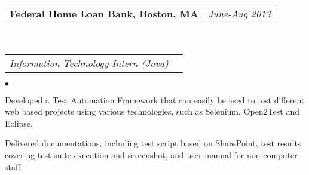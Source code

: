 \documentclass[11pt]{article}
\makeatletter
\newenvironment{achievements}{\begin{list}{$\bullet$}{\topsep 0pt \itemsep -2pt}}{\vspace*{4pt}\end{list}}
\newcommand{\headerrow}[2]
{\begin{tabular*}{\linewidth}{l@{\extracolsep{\fill}}r}
	\hspace*{-15pt}#1 & #2 \\
\end{tabular*}}
\newcommand{\headerrowww}[1]
{\begin{tabular*}{\linewidth}{l@{\extracolsep{\fill}}r}
	#1 &\\
\end{tabular*}}
\newcommand{\CPP}
 {C\nolinebreak[4]\hspace{-.05em}\raisebox{.22ex}{\footnotesize\bf ++}}
\makeatother
\begin{document}
\headerrow
{\textbf{Federal Home Loan Bank, Boston, MA}}
{\emph{June-Aug 2013}}
\\
\headerrowww
{\emph{Information Technology Intern (Java)}}
	\begin{achievements}
	\item Developed a Test Automation Framework that can easily be used to test different web based projects 
	using various technologies, such as Selenium, Open2Test and Eclipse.
	\item Delivered  documentations, including test script based on SharePoint, test results covering 
	test suite execution and screenshot, and user manual for non-computer staff.
	\end{achievements}
	
	




  
\end{document}
